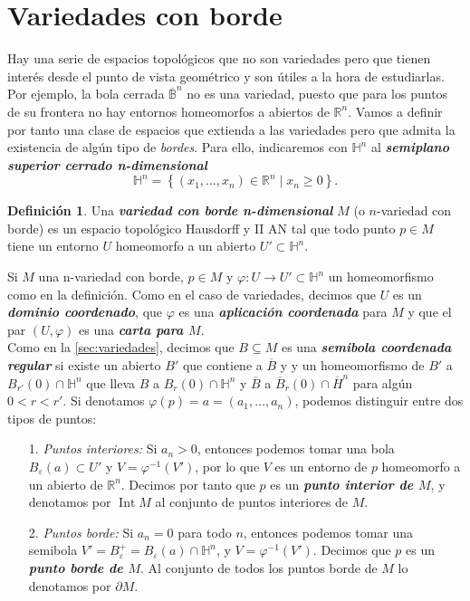 \documentclass[10pt]{report}
\newcommand{\R}{\mathbb{R}}
\DeclareMathOperator{\interior}{Int} %
\newcommand{\enfatiza}[1]{\textbf{\textit{#1}}}
\theoremstyle{definition}
\newtheorem{defin}{Definición}[section]
\begin{document}
\section{Variedades con borde}\label{sec:borde}
Hay una serie de espacios topológicos que no son variedades pero que tienen interés desde el punto de vista geométrico y son útiles a la hora de estudiarlas. Por ejemplo, la bola cerrada $\overline{\mathbb{B}}^n$ no es una variedad, puesto que para los puntos de su frontera no hay entornos homeomorfos a abiertos de $\R^n$. Vamos a definir por tanto una clase de espacios que extienda a las variedades pero que admita la existencia de algún tipo de \textit{bordes}. Para ello, indicaremos con $\mathbb{H}^n$ al \enfatiza{semiplano superior cerrado n-dimensional} $$\mathbb{H}^n=
\left\{(x_1,\dots ,x_n)\in \R^n\mid x_n\geq 0\right\}.$$
\begin{defin}
Una \enfatiza{variedad con borde n-dimensional} $M$ (o $n$-variedad con borde) es un espacio topológico  Hausdorff y II AN tal que todo punto $p\in M$ tiene un entorno $U$ homeomorfo a un abierto $U'\subset \mathbb{H}^n$.
\end{defin}
Si $M$ una n-variedad con borde, $p\in M$ y $\varphi :U\to U'\subset \mathbb{H}^n$ un homeomorfismo como en la definición. Como en el caso de variedades, decimos que $U$ es un \enfatiza{dominio coordenado}, que $\varphi$ es una \enfatiza{aplicación coordenada} para $M$ y que el par $(U,\varphi )$ es una \enfatiza{carta para $M$}.\\
Como en la \autoref{sec:variedades}, decimos que $B\subseteq M$ es una \enfatiza{semibola coordenada regular} si existe un abierto $B'$ que contiene a $\overline{B}$ y y un homeomorfismo de $B'$ a $B_{r'}(0)\cap \mathbb{H}^n$ que lleva $B$ a $B_r(0)\cap \mathbb{H}^n$ y $\overline{B}$ a $\overline{B}_r(0)\cap \overline{H}^n$ para algún $0<r<r'$.
Si denotamos $\varphi (p)=a=(a_1,\dots ,a_n)$, podemos distinguir entre dos tipos de puntos:
\begin{itemize}

\item[1.] \textit{Puntos interiores:} Si $a_n>0$, entonces podemos tomar una bola $B_{\varepsilon}(a)\subset U'$ y $V=\varphi^{-1}(V')$, por lo que $V$ es un entorno de $p$ homeomorfo a un abierto de $\R^n$. Decimos por tanto que $p$ es un \enfatiza{punto interior de $M$}, y denotamos por $\interior{M}$ al conjunto de puntos interiores de $M$.
\item[2.] \textit{Puntos borde:} Si $a_n=0$ para todo $n$, entonces podemos tomar una semibola $V'=B_{\varepsilon}^{+}=B_{\varepsilon}(a)\cap \mathbb{H}^n$, y $V=\varphi^{-1}(V')$. Decimos que $p$ es un \enfatiza{punto borde de $M$}. Al conjunto de todos los puntos borde de $M$ lo denotamos por $\partial M$.
\end{itemize}
\end{document}
